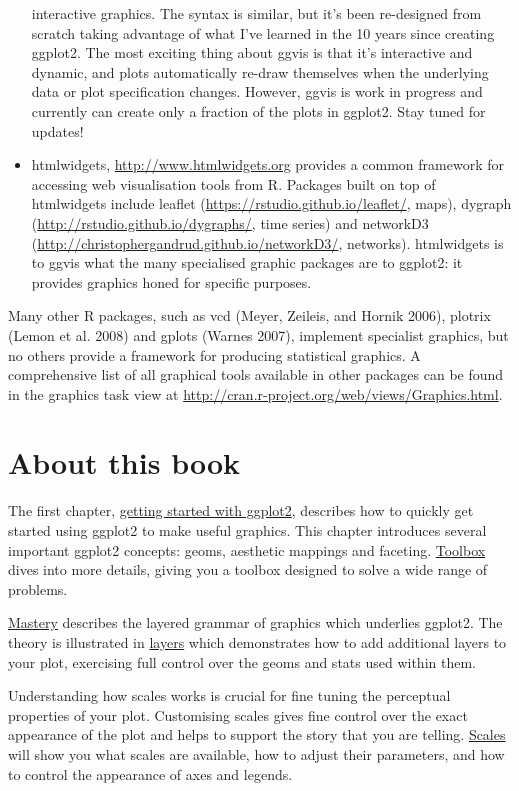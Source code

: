 \begin{itemize}
  interactive graphics. The syntax is similar, but it's been re-designed
  from scratch taking advantage of what I've learned in the 10 years
  since creating ggplot2. The most exciting thing about ggvis is that
  it's interactive and dynamic, and plots automatically re-draw
  themselves when the underlying data or plot specification changes.
  However, ggvis is work in progress and currently can create only a
  fraction of the plots in ggplot2. Stay tuned for updates!
\item
  htmlwidgets, \url{http://www.htmlwidgets.org} provides a common
  framework for accessing web visualisation tools from R. Packages built
  on top of htmlwidgets include leaflet
  (\url{https://rstudio.github.io/leaflet/}, maps), dygraph
  (\url{http://rstudio.github.io/dygraphs/}, time series) and networkD3
  (\url{http://christophergandrud.github.io/networkD3/}, networks).
  htmlwidgets is to ggvis what the many specialised graphic packages are
  to ggplot2: it provides graphics honed for specific purposes.
\end{itemize}

Many other R packages, such as vcd (Meyer, Zeileis, and Hornik 2006),
plotrix (Lemon et al. 2008) and gplots (Warnes 2007), implement
specialist graphics, but no others provide a framework for producing
statistical graphics. A comprehensive list of all graphical tools
available in other packages can be found in the graphics task view at
\url{http://cran.r-project.org/web/views/Graphics.html}.

\section{About this book}

The first chapter, \hyperref[cha:getting-started]{getting started with
ggplot2}, describes how to quickly get started using ggplot2 to make
useful graphics. This chapter introduces several important ggplot2
concepts: geoms, aesthetic mappings and faceting.
\hyperref[cha:toolbox]{Toolbox} dives into more details, giving you a
toolbox designed to solve a wide range of problems.

\hyperref[cha:mastery]{Mastery} describes the layered grammar of
graphics which underlies ggplot2. The theory is illustrated in
\hyperref[cha:layers]{layers} which demonstrates how to add additional
layers to your plot, exercising full control over the geoms and stats
used within them.

Understanding how scales works is crucial for fine tuning the perceptual
properties of your plot. Customising scales gives fine control over the
exact appearance of the plot and helps to support the story that you are
telling. \hyperref[cha:scales]{Scales} will show you what scales are
available, how to adjust their parameters, and how to control the
appearance of axes and legends.

